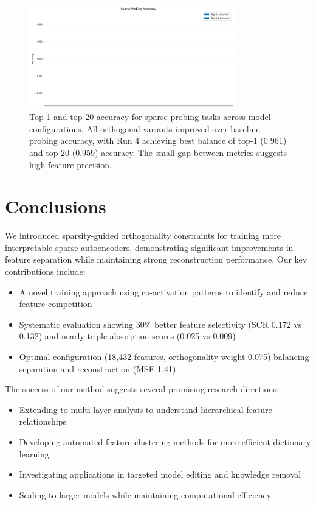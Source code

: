 \documentclass{article} %
\begin{document}
\begin{figure}[h]
    \centering
    \includegraphics[width=0.8\textwidth]{sparse_probing.png}
    \caption{Top-1 and top-20 accuracy for sparse probing tasks across model configurations. All orthogonal variants improved over baseline probing accuracy, with Run 4 achieving best balance of top-1 (0.961) and top-20 (0.959) accuracy. The small gap between metrics suggests high feature precision.}
    \label{fig:sparse_probing}
\end{figure}

\section{Conclusions}
\label{sec:conclusion}

We introduced sparsity-guided orthogonality constraints for training more interpretable sparse autoencoders, demonstrating significant improvements in feature separation while maintaining strong reconstruction performance. Our key contributions include:

\begin{itemize}
\item A novel training approach using co-activation patterns to identify and reduce feature competition
\item Systematic evaluation showing 30\% better feature selectivity (SCR 0.172 vs 0.132) and nearly triple absorption scores (0.025 vs 0.009)
\item Optimal configuration (18,432 features, orthogonality weight 0.075) balancing separation and reconstruction (MSE 1.41)
\end{itemize}

The success of our method suggests several promising research directions:

\begin{itemize}
\item Extending to multi-layer analysis to understand hierarchical feature relationships
\item Developing automated feature clustering methods for more efficient dictionary learning
\item Investigating applications in targeted model editing and knowledge removal
\item Scaling to larger models while maintaining computational efficiency
\end{itemize}
\end{document}
